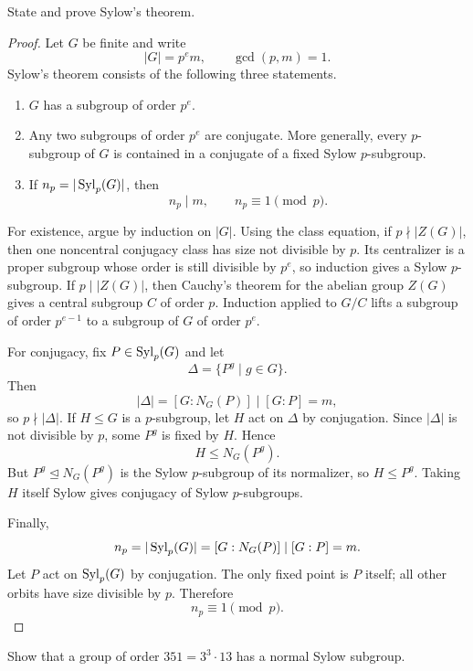 \begin{exercise}
State and prove Sylow's theorem.
\end{exercise}

\begin{proof}
Let \(G\) be finite and write
\[
    |G|=p^e m,
    \qquad
    \gcd(p,m)=1.
\]
Sylow's theorem consists of the following three statements.

\begin{enumerate}[label=\textup{(\arabic*)}]
    \item \(G\) has a subgroup of order \(p^e\).
    \item Any two subgroups of order \(p^e\) are conjugate. More generally, every
    \(p\)-subgroup of \(G\) is contained in a conjugate of a fixed Sylow
    \(p\)-subgroup.
    \item If \(n_p=|\operatorname{Syl}_p(G)|\), then
    \[
        n_p\mid m,
        \qquad
        n_p\equiv 1\pmod p.
    \]
\end{enumerate}

For existence, argue by induction on \(|G|\). Using the class equation, if
\(p\nmid |Z(G)|\), then one noncentral conjugacy class has size not divisible by
\(p\). Its centralizer is a proper subgroup whose order is still divisible by
\(p^e\), so induction gives a Sylow \(p\)-subgroup. If \(p\mid |Z(G)|\), then
Cauchy's theorem for the abelian group \(Z(G)\) gives a central subgroup
\(C\) of order \(p\). Induction applied to \(G/C\) lifts a subgroup of order
\(p^{e-1}\) to a subgroup of \(G\) of order \(p^e\).

For conjugacy, fix \(P\in \operatorname{Syl}_p(G)\) and let
\[
    \Delta=\{P^g\mid g\in G\}.
\]
Then
\[
    |\Delta|=[G:N_G(P)]\mid [G:P]=m,
\]
so \(p\nmid |\Delta|\). If \(H\leq G\) is a \(p\)-subgroup, let \(H\) act on
\(\Delta\) by conjugation. Since \(|\Delta|\) is not divisible by \(p\), some
\(P^g\) is fixed by \(H\). Hence
\[
    H\leq N_G(P^g).
\]
But \(P^g\trianglelefteq N_G(P^g)\) is the Sylow \(p\)-subgroup of its
normalizer, so \(H\leq P^g\). Taking \(H\) itself Sylow gives conjugacy of
Sylow \(p\)-subgroups.

Finally,
\[
    n_p=|\operatorname{Syl}_p(G)|=[G:N_G(P)]\mid [G:P]=m.
\]
Let \(P\) act on \(\operatorname{Syl}_p(G)\) by conjugation. The only fixed point is \(P\)
itself; all other orbits have size divisible by \(p\). Therefore
\[
    n_p\equiv 1\pmod p.
\]
\end{proof}

\begin{exercise}
Show that a group of order \(351 = 3^3 \cdot 13\) has a normal Sylow subgroup.
\end{exercise}

